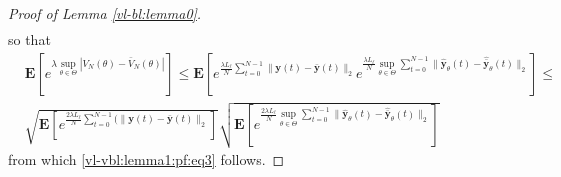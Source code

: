 \documentclass{article}
\def\rvy{{\mathbf{y}}}
\newcommand{\y}{\mathbf{y}}
\newcommand{\bE}{\mathbf{E}}
\begin{document}
\begin{proof}[Proof of Lemma \ref{vl-bl:lemma0}]
\begin{align*}
\end{align*}
so that
\begin{align*}
   & \bE[e^{\lambda \sup_{\theta \in \Theta}|V_N(\theta) - \bar{V}_N(\theta)|}]
   \le \bE[e^{\frac{\lambda L_{\ell}}{N} \sum_{t=0}^{N-1}
    \|\y(t)-\bar{\y}(t)\|_2}e^{\frac{\lambda L_{\ell}}{N} \sup_{\theta \in \Theta}\sum_{t=0}^{N-1} \|\hat{\rvy}_{\theta}(t)-\hat{\bar{\rvy}}_{\theta}(t)\|_2}]
    \le  \\
    & \sqrt{\bE[e^{\frac{2 \lambda L_{\ell}}{N} \sum_{t=0}^{N-1}
    (\|\y(t)-\bar{\y}(t)\|_2}]}\sqrt{\bE[e^{\frac{2 \lambda L_{\ell}}{N} \sup_{\theta \in \Theta} \sum_{t=0}^{N-1} \|\hat{\rvy}_{\theta}(t)-\hat{\bar{\rvy}}_{\theta}(t)\|_2}]}
\end{align*}
from which \eqref{vl-vbl:lemma1:pf:eq3} follows.
\end{proof}
\end{document}
